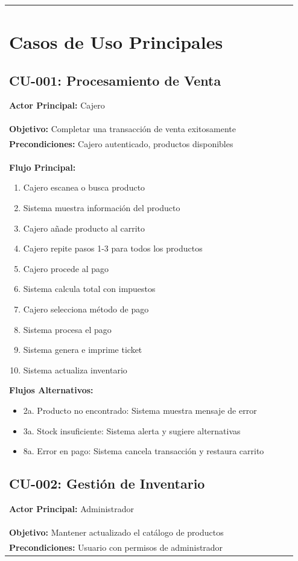 \documentclass[12pt,letterpaper]{article}
\begin{document}
\begin{longtable}{|p{3cm}|p{2cm}|p{4cm}|p{6cm}|}
\section{Casos de Uso Principales}

\subsection{CU-001: Procesamiento de Venta}
\textbf{Actor Principal:} Cajero \\
\textbf{Objetivo:} Completar una transacción de venta exitosamente \\
\textbf{Precondiciones:} Cajero autenticado, productos disponibles \\

\textbf{Flujo Principal:}
\begin{enumerate}
    \item Cajero escanea o busca producto
    \item Sistema muestra información del producto
    \item Cajero añade producto al carrito
    \item Cajero repite pasos 1-3 para todos los productos
    \item Cajero procede al pago
    \item Sistema calcula total con impuestos
    \item Cajero selecciona método de pago
    \item Sistema procesa el pago
    \item Sistema genera e imprime ticket
    \item Sistema actualiza inventario
\end{enumerate}

\textbf{Flujos Alternativos:}
\begin{itemize}
    \item 2a. Producto no encontrado: Sistema muestra mensaje de error
    \item 3a. Stock insuficiente: Sistema alerta y sugiere alternativas
    \item 8a. Error en pago: Sistema cancela transacción y restaura carrito
\end{itemize}

\subsection{CU-002: Gestión de Inventario}
\textbf{Actor Principal:} Administrador \\
\textbf{Objetivo:} Mantener actualizado el catálogo de productos \\
\textbf{Precondiciones:} Usuario con permisos de administrador \\


\end{longtable}
\end{document}
